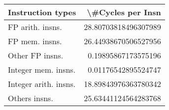 \begin{tabular}{lr}
\toprule
     Instruction types &     \textbackslash \#Cycles per Insn \\
\midrule
      FP arith. insns. &  28.80703818496307989 \\
        FP mem. insns. &  26.44938670506527956 \\
       Other FP insns. &   0.19895867173575196 \\
   Integer mem. insns. &   0.01176542895524747 \\
 Integer arith. insns. &  18.89843976363780342 \\
         Others insns. &  25.63441124564283768 \\
\bottomrule
\end{tabular}
